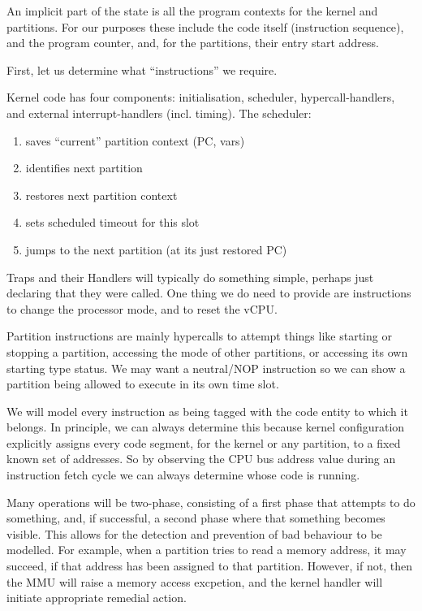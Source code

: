 An implicit part of the state is all the program
contexts for the kernel and partitions.
For our purposes these include the code itself (instruction sequence),
and the program counter, and, for the partitions,
their entry start address.

First, let us determine what ``instructions'' we require.

Kernel code has four components:
initialisation, scheduler, hypercall-handlers,
and external interrupt-handlers (incl. timing).
The scheduler:
\begin{enumerate}
  \item saves ``current'' partition context (PC, vars)
  \item identifies next partition
  \item restores next partition context
  \item sets scheduled timeout for this slot
  \item jumps to the next partition (at its just restored PC)
\end{enumerate}
Traps and their Handlers will typically do something simple,
perhaps just declaring that they were called.
One thing we do need to provide are instructions
to change the processor mode, and to reset the vCPU.

Partition instructions are mainly hypercalls to attempt
things like starting or stopping a partition,
accessing the mode of other partitions,
or accessing its own starting type status.
We may want a neutral/NOP instruction so we can show a partition
being allowed to execute in its own time slot.

We will model every instruction as being tagged with the code entity to
which it belongs.
In principle, we can always determine this because kernel configuration
explicitly assigns every code segment,
for the kernel or any partition,
to a fixed known set of addresses.
So by observing the CPU bus address value during an instruction fetch cycle
we can always determine whose code is running.

Many operations will be two-phase,
consisting of a first phase that attempts to do something,
and, if successful, a second phase where that something becomes visible.
This allows for the detection and prevention of bad behaviour to be modelled.
For example, when a partition tries to read a memory address,
it may succeed, if that address has been assigned to that partition.
However, if not, then the MMU will raise a memory access excpetion,
and the kernel handler will initiate appropriate remedial action.


